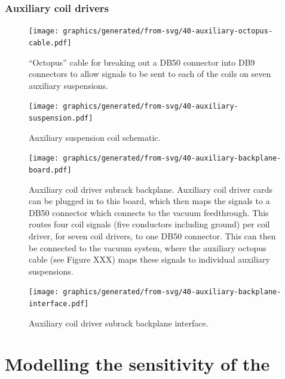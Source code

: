 \subsubsection{Auxiliary coil drivers}

\begin{figure}
  \centering
  \texttt{[image: graphics/generated/from-svg/40-auxiliary-octopus-cable.pdf]}
  \caption[Auxiliary octopus cable schematic]{\label{fig:aux-octopus-cable-wiring}``Octopus'' cable for breaking out a DB50 connector into DB9 connectors to allow signals to be sent to each of the coils on seven auxiliary suspensions.}
\end{figure}

\begin{figure}
  \centering
  \texttt{[image: graphics/generated/from-svg/40-auxiliary-suspension.pdf]}
  \caption[Auxiliary suspension coil schematic]{\label{fig:aux-suspension-wiring}Auxiliary suspension coil schematic.}
\end{figure}

\begin{figure}
  \centering
  \texttt{[image: graphics/generated/from-svg/40-auxiliary-backplane-board.pdf]}
  \caption[Auxiliary subrack backplane board schematic]{\label{fig:aux-backplane-schematic}Auxiliary coil driver subrack backplane. Auxiliary coil driver cards can be plugged in to this board, which then maps the signals to a DB50 connector which connects to the vacuum feedthrough. This routes four coil signals (five conductors including ground) per coil driver, for seven coil drivers, to one DB50 connector. This can then be connected to the vacuum system, where the auxiliary octopus cable (see Figure XXX) maps these signals to individual auxiliary suspensions.}
\end{figure}

\begin{figure}
  \centering
  \texttt{[image: graphics/generated/from-svg/40-auxiliary-backplane-interface.pdf]}
  \caption[Auxiliary subrack backplane interface]{\label{fig:aux-backplane-interface}Auxiliary coil driver subrack backplane interface.}
\end{figure}

\section{Modelling the sensitivity of the \SSM{}}
